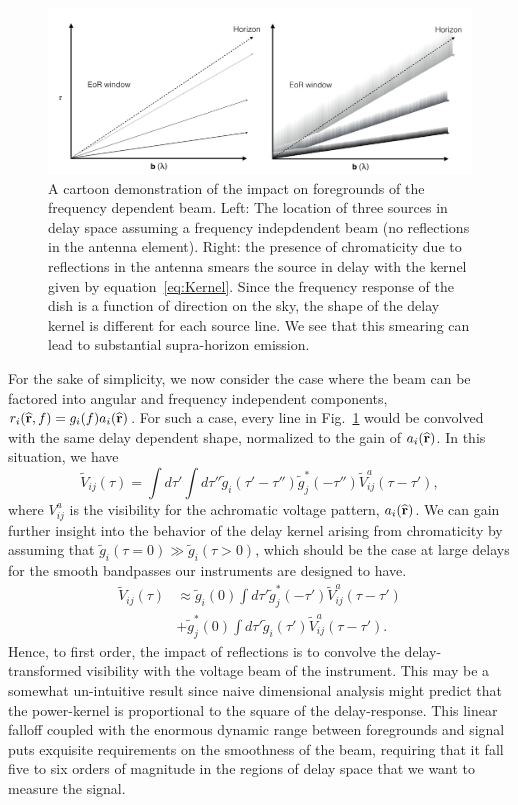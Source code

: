 \documentclass[twocolumn]{emulateapj}
\begin{document}
\begin{figure}
\includegraphics[width=\textwidth]{figures/wedgeCompare.pdf}
\caption{A cartoon demonstration of the impact on foregrounds of the frequency dependent beam. Left: The location of three sources in delay space assuming a frequency indepdendent beam (no reflections in the antenna element). Right: the presence of chromaticity due to reflections in the antenna smears the source in delay with the kernel given by equation~\ref{eq:Kernel}. Since the frequency response of the dish is a function of direction on the sky, the shape of the delay kernel is different for each source line. We see that this smearing can lead to substantial supra-horizon emission.}
\label{fig:Smearing}
\end{figure}
For the sake of simplicity, we now consider the case where the beam can be factored into angular and frequency independent components, $r_i(\widehat{\bf r},f) = g_i(f)a_i(\widehat{\bf r})$. For such a case, every line in Fig.~\ref{fig:Smearing} would be convolved with the same delay dependent shape, normalized to the gain of $a_i(\widehat{\bf r})$. In this situation, we have
\begin{equation}
\widetilde{V}_{ij}(\tau) = \int d\tau' \int d \tau'' \widetilde{g}_i(\tau' - \tau'')\widetilde{g}^*_j(-\tau'') \widetilde{V}_{ij}^a(\tau-\tau'),
\end{equation}
where $V_{ij}^a$ is the visibility for the achromatic voltage pattern, $a_i(\widehat{\bf r})$. 
We can gain further insight into the behavior of the delay kernel arising from chromaticity by assuming that $\widetilde{g}_i(\tau=0)\gg\widetilde{g}_i(\tau>0)$, which should be the case at large delays for the smooth bandpasses our instruments are designed to have. 
\begin{align}\label{eq:KernelApprox}
\widetilde{V}_{ij}(\tau) &\approx \widetilde{g}_i(0)\int d \tau' \widetilde{g}_j^*(-\tau')\widetilde{V}^a_{ij}(\tau- \tau') \nonumber \\
& + \widetilde{g}_j^*(0) \int d \tau' \widetilde{g}_i(\tau')\widetilde{V}^a_{ij}(\tau-\tau').
\end{align}
Hence, to first order, the impact of reflections is to convolve the delay-transformed visibility with the voltage beam of the instrument. This may be a somewhat un-intuitive result since naive dimensional analysis might predict that the power-kernel is proportional to the square of the delay-response. This linear falloff coupled with the enormous dynamic range between foregrounds and signal puts exquisite requirements on the smoothness of the beam, requiring that it fall five to six orders of magnitude in the regions of delay space that we want to measure the signal.
\end{document}
